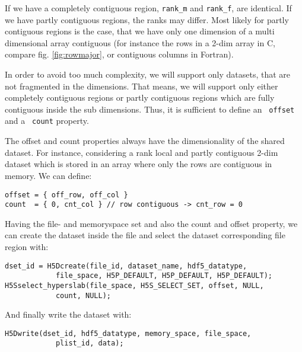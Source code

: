 \documentclass[12pt,a4paper]{amsart}
\numberwithin{equation}{section}
\theoremstyle{plain}
\theoremstyle{definition}
\begin{document}
If we have a completely contiguous region, {\tt rank\_m} and 
{\tt rank\_f}, are identical. If we have partly contiguous regions, 
the ranks may differ. Most likely for partly contiguous regions
is the case, that we have only one dimension of a multi dimensional
array contiguous (for instance the rows in a 2-dim array in C, compare
fig. \ref{fig:rowmajor}, or contiguous columns in Fortran). 

In order to avoid too much complexity, we will support only datasets,
that are not fragmented in the dimensions. That means, we will support
only either completely contiguous regions or partly contiguous regions
which are fully contiguous inside the sub dimensions. Thus, it is
sufficient to define an {\tt~offset} and a {\tt~count} property.

The offset and count properties always have the dimensionality of the
shared dataset. For instance, considering a rank local and partly
contiguous 2-dim dataset which is stored in an array where 
only the rows are contiguous in memory. We can define:
\begin{lstlisting}[style=CStyle]
offset = { off_row, off_col }
count  = { 0, cnt_col } // row contiguous -> cnt_row = 0
\end{lstlisting}

Having the file- and memoryspace set and also the count and offset
property, we can create the dataset inside the file and select the 
dataset corresponding file region with:
\begin{lstlisting}[style=CStyle]
dset_id = H5Dcreate(file_id, dataset_name, hdf5_datatype, 
            file_space, H5P_DEFAULT, H5P_DEFAULT, H5P_DEFAULT);
H5Sselect_hyperslab(file_space, H5S_SELECT_SET, offset, NULL, 
            count, NULL);
\end{lstlisting}
And finally write the dataset with:
\begin{lstlisting}[style=CStyle]
H5Dwrite(dset_id, hdf5_datatype, memory_space, file_space, 
            plist_id, data);
\end{lstlisting}
\end{document}
